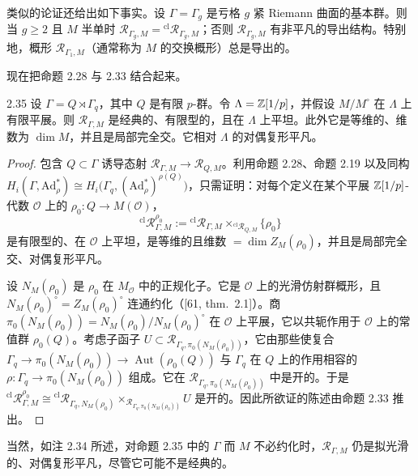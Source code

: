 类似的论证还给出如下事实。设 $\Gamma = \Gamma_g$ 是亏格 $g$ 紧 Riemann 曲面的基本群。则当 $g \ge 2$ 且 $M$ 半单时 $\mathcal R_{\Gamma_g,M} = {}^{\mathrm{cl}}\mathcal R_{\Gamma_g,M}$；否则 $\mathcal R_{\Gamma_g,M}$ 有非平凡的导出结构。特别地，概形 $\mathcal R_{\Gamma_1,M}$（通常称为 $M$ 的交换概形）总是导出的。

现在把命题 2.28 与 2.33 结合起来。

\begin{prop}{2.35}
设 $\Gamma = Q \rtimes \Gamma_q$，其中 $Q$ 是有限 $p$-群。令 $\Lambda = \mathbb{Z}[1/p]$，并假设 $M/M^\circ$ 在 $\Lambda$ 上有限平展。则 $\mathcal R_{\Gamma,M}$ 是经典的、有限型的，且在 $\Lambda$ 上平坦。此外它是等维的、维数为 $\dim M$，并且是局部完全交。它相对 $\Lambda$ 的对偶复形平凡。
\label{prop:zhu2-2-35}
\end{prop}

\begin{proof}
包含 $Q \subset \Gamma$ 诱导态射 $\mathcal R_{\Gamma,M} \to \mathcal R_{Q,M}$。利用命题 2.28、命题 2.19 以及同构 $H_i(\Gamma,\mathrm{Ad}^*_\rho) \cong H_i\bigl(\Gamma_q,(\mathrm{Ad}^*_\rho)^{\rho(Q)}\bigr)$，只需证明：对每个定义在某个平展 $\mathbb{Z}[1/p]$-代数 $\mathcal O$ 上的 $\rho_0\colon Q \to M(\mathcal O)$，
\[
{}^{\mathrm{cl}}\mathcal R^{\rho_0}_{\Gamma,M} := {}^{\mathrm{cl}}\mathcal R_{\Gamma,M}\times_{{}^{\mathrm{cl}}\mathcal R_{Q,M}}\{\rho_0\}
\]
是有限型的、在 $\mathcal O$ 上平坦，是等维的且维数 $= \dim Z_M(\rho_0)$，并且是局部完全交、对偶复形平凡。

设 $N_M(\rho_0)$ 是 $\rho_0$ 在 $M_{\mathcal O}$ 中的正规化子。它是 $\mathcal O$ 上的光滑仿射群概形，且 $N_M(\rho_0)^\circ = Z_M(\rho_0)^\circ$ 连通约化（[61, thm.\ 2.1]）。商 $\pi_0(N_M(\rho_0)) = N_M(\rho_0)/N_M(\rho_0)^\circ$ 在 $\mathcal O$ 上平展，它以共轭作用于 $\mathcal O$ 上的常值群 $\rho_0(Q)$。考虑子函子 $U \subset \mathcal R_{\Gamma_q,\pi_0(N_M(\rho_0))}$，它由那些使复合 $\Gamma_q \to \pi_0(N_M(\rho_0)) \to \operatorname{Aut}(\rho_0(Q))$ 与 $\Gamma_q$ 在 $Q$ 上的作用相容的 $\rho\colon \Gamma_q \to \pi_0(N_M(\rho_0))$ 组成。它在 $\mathcal R_{\Gamma_q,\pi_0(N_M(\rho_0))}$ 中是开的。于是 ${}^{\mathrm{cl}}\mathcal R^{\rho_0}_{\Gamma,M} \cong {}^{\mathrm{cl}}\mathcal R_{\Gamma_q,N_M(\rho_0)}\times_{\mathcal R_{\Gamma_q,\pi_0(N_M(\rho_0))}}U$ 是开的。因此所欲证的陈述由命题 2.33 推出。
\end{proof}

当然，如注 2.34 所述，对命题 2.35 中的 $\Gamma$ 而 $M$ 不必约化时，$\mathcal R_{\Gamma,M}$ 仍是拟光滑的、对偶复形平凡，尽管它可能不是经典的。


